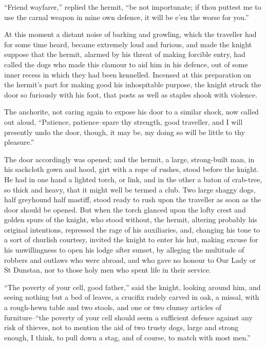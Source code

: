 ``Friend wayfarer,'' replied the hermit, ``be not importunate; if thou
puttest me to use the carnal weapon in mine own defence, it will be e'en
the worse for you.''

At this moment a distant noise of barking and growling, which the
traveller had for some time heard, became extremely loud and furious,
and made the knight suppose that the hermit, alarmed by his threat of
making forcible entry, had called the dogs who made this clamour to aid
him in his defence, out of some inner recess in which they had been
kennelled. Incensed at this preparation on the hermit's part for making
good his inhospitable purpose, the knight struck the door so furiously
with his foot, that posts as well as staples shook with violence.

The anchorite, not caring again to expose his door to a similar shock,
now called out aloud, ``Patience, patience--spare thy strength, good
traveller, and I will presently undo the door, though, it may be, my
doing so will be little to thy pleasure.''

The door accordingly was opened; and the hermit, a large, strong-built
man, in his sackcloth gown and hood, girt with a rope of rushes, stood
before the knight. He had in one hand a lighted torch, or link, and in
the other a baton of crab-tree, so thick and heavy, that it might well
be termed a club. Two large shaggy dogs, half greyhound half mastiff,
stood ready to rush upon the traveller as soon as the door should be
opened. But when the torch glanced upon the lofty crest and golden spurs
of the knight, who stood without, the hermit, altering probably his
original intentions, repressed the rage of his auxiliaries, and,
changing his tone to a sort of churlish courtesy, invited the knight to
enter his hut, making excuse for his unwillingness to open his lodge
after sunset, by alleging the multitude of robbers and outlaws who were
abroad, and who gave no honour to Our Lady or St Dunstan, nor to those
holy men who spent life in their service.

``The poverty of your cell, good father,'' said the knight, looking
around him, and seeing nothing but a bed of leaves, a crucifix rudely
carved in oak, a missal, with a rough-hewn table and two stools, and one
or two clumsy articles of furniture--``the poverty of your cell should
seem a sufficient defence against any risk of thieves, not to mention
the aid of two trusty dogs, large and strong enough, I think, to pull
down a stag, and of course, to match with most men.''

